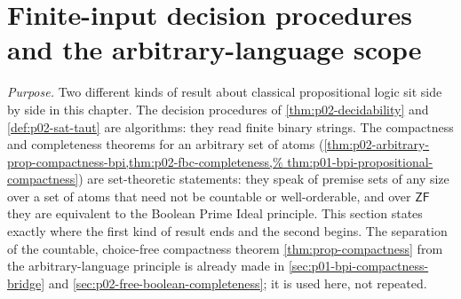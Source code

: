 \section{Finite-input decision procedures and the arbitrary-language scope}
\label{sec:p02-w02-p02-017-finite-input-scope}

\emph{Purpose.}  Two different kinds of result about classical
propositional logic sit side by side in this chapter.  The decision
procedures of \cref{thm:p02-decidability} and
\cref{def:p02-sat-taut} are algorithms: they read finite binary strings.
The compactness and completeness theorems for an arbitrary set of atoms
(\cref{thm:p02-arbitrary-prop-compactness-bpi,thm:p02-fbc-completeness,%
thm:p01-bpi-propositional-compactness}) are set-theoretic statements:
they speak of premise sets of any size over a set of atoms that need not
be countable or well-orderable, and over \(\mathsf{ZF}\) they are
equivalent to the Boolean Prime Ideal principle.  This section states
exactly where the first kind of result ends and the second begins.  The
separation of the countable, choice-free compactness theorem
\cref{thm:prop-compactness} from the arbitrary-language principle is
already made in \cref{sec:p01-bpi-compactness-bridge} and
\cref{sec:p02-free-boolean-completeness}; it is used here, not repeated.

